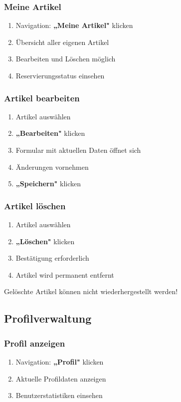 \documentclass[a4paper,12pt]{article}
\begin{document}
\subsubsection{Meine Artikel}
\begin{enumerate}
    \item Navigation: \textbf{„Meine Artikel"} klicken
    \item Übersicht aller eigenen Artikel
    \item Bearbeiten und Löschen möglich
    \item Reservierungsstatus einsehen
\end{enumerate}

\subsubsection{Artikel bearbeiten}
\begin{enumerate}
    \item Artikel auswählen
    \item \textbf{„Bearbeiten"} klicken
    \item Formular mit aktuellen Daten öffnet sich
    \item Änderungen vornehmen
    \item \textbf{„Speichern"} klicken
\end{enumerate}

\subsubsection{Artikel löschen}
\begin{enumerate}
    \item Artikel auswählen
    \item \textbf{„Löschen"} klicken
    \item Bestätigung erforderlich
    \item Artikel wird permanent entfernt
\end{enumerate}

\begin{warningbox}
Gelöschte Artikel können nicht wiederhergestellt werden!
\end{warningbox}

\subsection{Profilverwaltung}

\subsubsection{Profil anzeigen}
\begin{enumerate}
    \item Navigation: \textbf{„Profil"} klicken
    \item Aktuelle Profildaten anzeigen
    \item Benutzerstatistiken einsehen
\end{enumerate}
\end{document}
